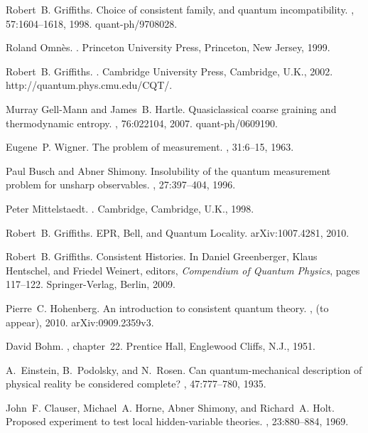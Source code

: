 \documentclass[12pt]{article} %
\begin{document}
\begin{thebibliography}{10}
Robert~B. Griffiths.
\newblock Choice of consistent family, and quantum incompatibility.
, 57:1604--1618, 1998.
\newblock quant-ph/9708028.

Roland Omn\`es.
.
\newblock Princeton University Press, Princeton, New Jersey, 1999.

Robert~B. Griffiths.
.
\newblock Cambridge University Press, Cambridge, U.K., 2002.
\newblock http://quantum.phys.cmu.edu/CQT/.

Murray Gell-Mann and James~B. Hartle.
\newblock Quasiclassical coarse graining and thermodynamic entropy.
, 76:022104, 2007.
\newblock quant-ph/0609190.

Eugene~P. Wigner.
\newblock The problem of measurement.
, 31:6--15, 1963.

Paul Busch and Abner Shimony.
\newblock Insolubility of the quantum measurement problem for unsharp
  observables.
, 27:397--404, 1996.

Peter Mittelstaedt.
.
\newblock Cambridge, Cambridge, U.K., 1998.

Robert~B. Griffiths.
\newblock E{P}{R}, {B}ell, and {Q}uantum {L}ocality.
\newblock arXiv:1007.4281, 2010.

Robert~B. Griffiths.
\newblock Consistent {H}istories.
\newblock In Daniel Greenberger, Klaus Hentschel, and Friedel Weinert, editors,
  {\em Compendium of Quantum Physics}, pages 117--122. Springer-Verlag, Berlin,
  2009.

Pierre~C. Hohenberg.
\newblock An introduction to consistent quantum theory.
, (to appear), 2010.
\newblock arXiv:0909.2359v3.

David Bohm.
, chapter~22.
\newblock Prentice Hall, Englewood Cliffs, N.J., 1951.

A.~Einstein, B.~Podolsky, and N.~Rosen.
\newblock Can quantum-mechanical description of physical reality be considered
  complete?
, 47:777--780, 1935.

John~F. Clauser, Michael~A. Horne, Abner Shimony, and Richard~A. Holt.
\newblock Proposed experiment to test local hidden-variable theories.
, 23:880--884, 1969.


\end{thebibliography}
\end{document}

